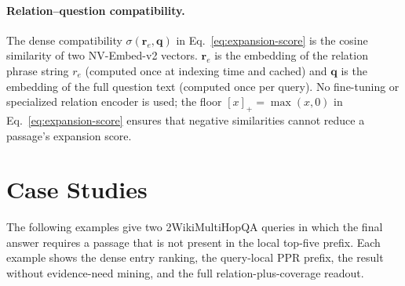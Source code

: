 \paragraph{Relation--question compatibility.}
The dense compatibility $\sigma(\mathbf{r}_e, \mathbf{q})$ in
Eq.~\ref{eq:expansion-score} is the cosine similarity of two
NV-Embed-v2 vectors. $\mathbf{r}_e$ is the embedding of the relation
phrase string $r_e$ (computed once at indexing time and cached) and
$\mathbf{q}$ is the embedding of the full question text (computed
once per query). No fine-tuning or specialized relation encoder is
used; the floor $[x]_{+}=\max(x,0)$ in Eq.~\ref{eq:expansion-score}
ensures that negative similarities cannot reduce a passage's
expansion score.

\section{Case Studies}
\label{app:case-study}

The following examples give two 2WikiMultiHopQA queries in which the
final answer requires a passage that is not present in the local
top-five prefix. Each example shows the dense entry ranking, the
query-local PPR prefix, the result without evidence-need mining, and the
full relation-plus-coverage readout.

